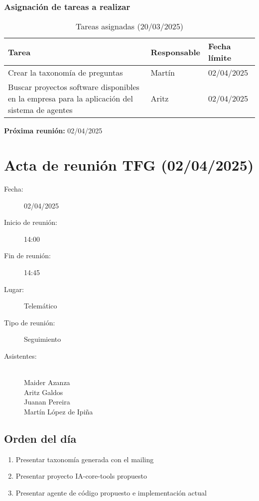 \subsubsection{Asignación de tareas a realizar}
\begin{table}[h]
    \centering
    \begin{tabular}{|p{8cm}|p{3cm}|p{3cm}|}
        \hline
        \textbf{Tarea} & \textbf{Responsable} & \textbf{Fecha límite} \\
        \hline
        Crear la taxonomía de preguntas & Martín & 02/04/2025 \\
        \hline
        Buscar proyectos software disponibles en la empresa para la aplicación del sistema de agentes & Aritz & 02/04/2025 \\
        \hline
    \end{tabular}
    \caption{Tareas asignadas (20/03/2025)}
\end{table}

\textbf{Próxima reunión:} 02/04/2025

\clearpage

\section{Acta de reunión TFG (02/04/2025)}

\begin{description}
    \item[Fecha:] 02/04/2025
    \item[Inicio de reunión:] 14:00
    \item[Fin de reunión:] 14:45
    \item[Lugar:] Telemático
    \item[Tipo de reunión:] Seguimiento
    \item[Asistentes:] ~\\
    Maider Azanza\\
    Aritz Galdos\\
    Juanan Pereira\\
    Martín López de Ipiña
\end{description}

\subsection{Orden del día}
\begin{enumerate}
    \item Presentar taxonomía generada con el mailing
    \item Presentar proyecto IA-core-tools propuesto
    \item Presentar agente de código propuesto e implementación actual
\end{enumerate}

